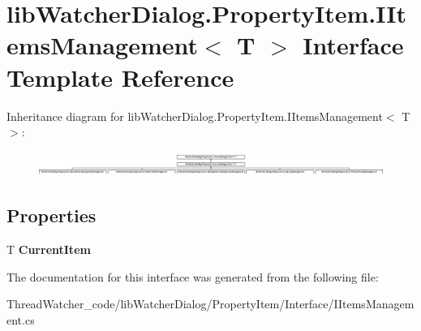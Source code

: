 \hypertarget{interfacelib_watcher_dialog_1_1_property_item_1_1_i_items_management_3_01_t_01_4}{\section{lib\+Watcher\+Dialog.\+Property\+Item.\+I\+Items\+Management$<$ T $>$ Interface Template Reference}
\label{interfacelib_watcher_dialog_1_1_property_item_1_1_i_items_management_3_01_t_01_4}
}
Inheritance diagram for lib\+Watcher\+Dialog.\+Property\+Item.\+I\+Items\+Management$<$ T $>$\+:\begin{figure}[H]
\begin{center}
\leavevmode
\includegraphics[height=0.805755cm]{interfacelib_watcher_dialog_1_1_property_item_1_1_i_items_management_3_01_t_01_4}
\end{center}
\end{figure}
\subsection*{Properties}
\begin{DoxyCompactItemize}
\item 
\hypertarget{interfacelib_watcher_dialog_1_1_property_item_1_1_i_items_management_3_01_t_01_4_a9bc493a849d725559ecd1c962f0f1874}{T {\bfseries Current\+Item}}\label{interfacelib_watcher_dialog_1_1_property_item_1_1_i_items_management_3_01_t_01_4_a9bc493a849d725559ecd1c962f0f1874}

\end{DoxyCompactItemize}


The documentation for this interface was generated from the following file\+:\begin{DoxyCompactItemize}
\item 
Thread\+Watcher\+\_\+code/lib\+Watcher\+Dialog/\+Property\+Item/\+Interface/I\+Items\+Management.\+cs\end{DoxyCompactItemize}
